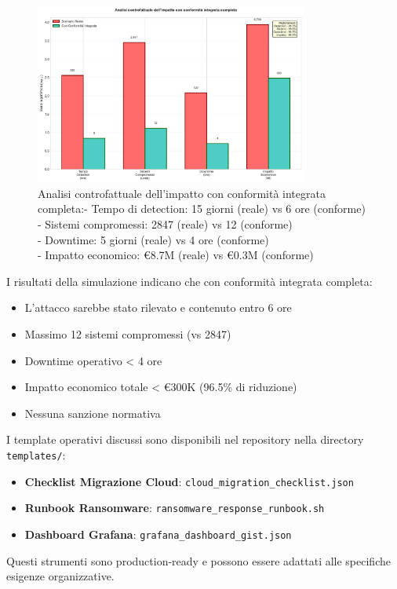 \begin{figure}[htbp]

\centering

\includegraphics[width=0.8\textwidth]{thesis_figures/cap4/figura_4_5_controfattuale.pdf}

\caption [Analisi controfattuale dell'impatto con conformità integrata completa]{Analisi controfattuale dell'impatto con conformità integrata completa:- Tempo di detection: 15 giorni (reale) vs 6 ore (conforme)\\
- Sistemi compromessi: 2847 (reale) vs 12 (conforme)\\
- Downtime: 5 giorni (reale) vs 4 ore (conforme)\\
- Impatto economico: €8.7M (reale) vs €0.3M (conforme)}
\label{fig:controfattuale}
\end{figure}

I risultati della simulazione indicano che con conformità integrata completa:
\begin{itemize}
    \item L'attacco sarebbe stato rilevato e contenuto entro 6 ore
    \item Massimo 12 sistemi compromessi (vs 2847)
    \item Downtime operativo < 4 ore
    \item Impatto economico totale < €300K (96.5\% di riduzione)
    \item Nessuna sanzione normativa
\end{itemize}

\begin{tcolorbox}[colback=orange!5!white,colframe=orange!75!black,title=Template Operativi]
I template operativi discussi sono disponibili nel repository nella directory \texttt{templates/}:
\begin{itemize}
    \item \textbf{Checklist Migrazione Cloud}: \texttt{cloud\_migration\_checklist.json}
    \item \textbf{Runbook Ransomware}: \texttt{ransomware\_response\_runbook.sh}
    \item \textbf{Dashboard Grafana}: \texttt{grafana\_dashboard\_gist.json}
\end{itemize}
Questi strumenti sono production-ready e possono essere adattati alle specifiche esigenze organizzative.
\end{tcolorbox}

